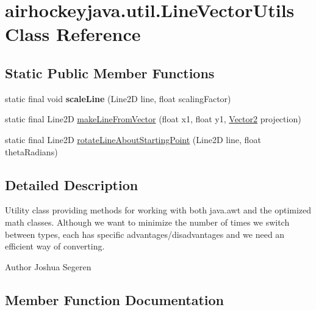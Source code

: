 \hypertarget{classairhockeyjava_1_1util_1_1_line_vector_utils}{}\section{airhockeyjava.\+util.\+Line\+Vector\+Utils Class Reference}
\label{classairhockeyjava_1_1util_1_1_line_vector_utils}
\subsection*{Static Public Member Functions}
\begin{DoxyCompactItemize}
\item 
\hypertarget{classairhockeyjava_1_1util_1_1_line_vector_utils_ac7d582940d67835e3342d3e72db58bc3}{}static final void {\bfseries scale\+Line} (Line2\+D line, float scaling\+Factor)\label{classairhockeyjava_1_1util_1_1_line_vector_utils_ac7d582940d67835e3342d3e72db58bc3}

\item 
static final Line2\+D \hyperlink{classairhockeyjava_1_1util_1_1_line_vector_utils_a22a2954771e72704b94ca79fe69969ab}{make\+Line\+From\+Vector} (float x1, float y1, \hyperlink{classairhockeyjava_1_1util_1_1_vector2}{Vector2} projection)
\item 
static final Line2\+D \hyperlink{classairhockeyjava_1_1util_1_1_line_vector_utils_a4f792c1276505e91595099b5d1a7ff0a}{rotate\+Line\+About\+Starting\+Point} (Line2\+D line, float theta\+Radians)
\end{DoxyCompactItemize}


\subsection{Detailed Description}
Utility class providing methods for working with both java.\+awt and the optimized math classes. Although we want to minimize the number of times we switch between types, each has specific advantages/disadvantages and we need an efficient way of converting. \begin{DoxyAuthor}{Author}
Joshua Segeren 
\end{DoxyAuthor}


\subsection{Member Function Documentation}
\hypertarget{classairhockeyjava_1_1util_1_1_line_vector_utils_a22a2954771e72704b94ca79fe69969ab}{}
